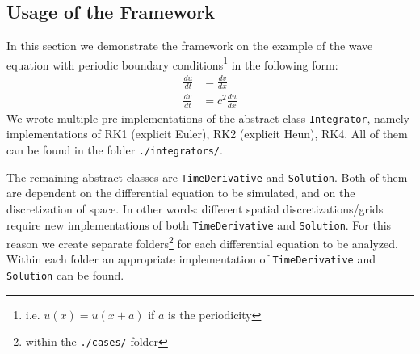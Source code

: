 \subsection{Usage of the Framework}
In this section we demonstrate the framework on the example of the wave equation with periodic boundary conditions\footnote{i.e. $u(x)=u(x+a)$ if $a$ is the periodicity} in the following form:
\begin{align*}
\frac{du}{dt} &= \frac{dv}{dx}\\
\frac{dv}{dt} &= c^2\frac{du}{dx}
\end{align*}
We wrote multiple pre-implementations of the abstract class \texttt{Integrator}, namely implementations of RK1 (explicit Euler), RK2 (explicit Heun), RK4.
All of them can be found in the folder \texttt{./integrators/}.

The remaining abstract classes are \texttt{TimeDerivative} and \texttt{Solution}.
Both of them are dependent on the differential equation to be simulated, and on the discretization of space.
In other words: different spatial discretizations/grids require new implementations of both \texttt{TimeDerivative} and \texttt{Solution}.
For this reason we create separate folders\footnote{within the \texttt{./cases/} folder} for each differential equation to be analyzed.
Within each folder an appropriate implementation of \texttt{TimeDerivative} and \texttt{Solution} can be found.
\\

